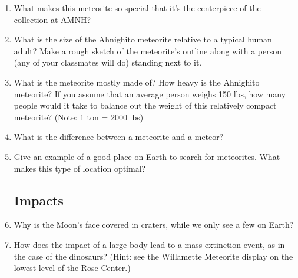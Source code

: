 \documentclass[12pt]{article}
\begin{document}
\begin{enumerate}
\item What makes this meteorite so special that it's the centerpiece of the
collection at AMNH?

\vspace{1in}

\item What is the size of the Ahnighito meteorite relative to a typical human adult?  Make a rough sketch of the meteorite's outline along with a person (any of your classmates will do) standing next to it. 



\vspace{3.5in}

\item What is the meteorite mostly made of?  How heavy is the Ahnighito meteorite?
If you assume that an average person weighs 150 lbs, 
how many people would it take to balance out the weight of this relatively compact 
meteorite?  (Note: 1 ton = 2000 lbs)

\vspace{1.5in}

\item What is the difference between a meteorite and a meteor? 

\vspace{1.5cm}

\item Give an example of a good place on Earth to search for meteorites.  What makes this type of location optimal?

\vspace{2.5cm}


\subsection{Impacts}

\item Why is the Moon's face covered in craters, while we only see a few on Earth? 

\vspace{2.5cm}

\item How does the impact of a large body lead to a mass extinction event, as in the
case of the dinosaurs?  (Hint: see the Willamette Meteorite display on the lowest level of the Rose Center.)

\vspace{3cm}


\end{enumerate}
\end{document}
